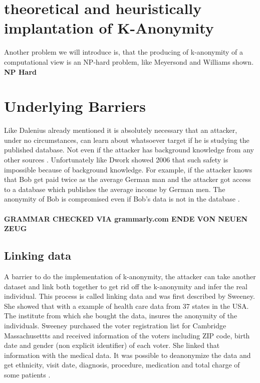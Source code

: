 \documentclass{llncs}
\begin{document}
\section{theoretical and heuristically implantation of K-Anonymity}
Another problem we will introduce is, that the producing of k-anonymity of a computational view is an NP-hard problem, like Meyersond and Williams shown.
\textbf{NP Hard}  
\section{Underlying Barriers}
Like Dalenius already mentioned it is absolutely necessary that an attacker, under no circumstances, can learn about whatsoever target if he is studying the published database. Not even if the attacker has background knowledge from any other sources  \cite{Dalenius1977}. Unfortunately like Dwork showed 2006 that such safety is impossible because of background knowledge. For example, if the attacker knows that Bob get paid twice as the average German man and the attacker got access to a database which publishes the average income by German men. The anonymity of Bob is compromised even if Bob's data is not in the database \cite{dwork2011differential}.  

\paragraph{GRAMMAR CHECKED VIA grammarly.com ENDE VON NEUEN ZEUG}

\subsection{Linking data}
A barrier to do the implementation of k-anonymity, the attacker can take another dataset and link both together to get rid off the k-anonymity and infer the real individual. This process is called linking data and was first described by Sweeney\cite{sweeney2002k}. She showed that with a example of health care data from 37 states in the USA. The institute from which she bought the data, insures the anonymity of the individuals. Sweeney purchased the voter registration list for Cambridge Massachusettts and received information of the voters including ZIP code, birth date and gender (non explicit identifier) of each voter. She linked that information with the medical data. It was possible to deanonymize the data  and get ethnicity, visit date, diagnosis, procedure, medication and total charge of some patients \cite{sweeney2002k}. 
\end{document}
